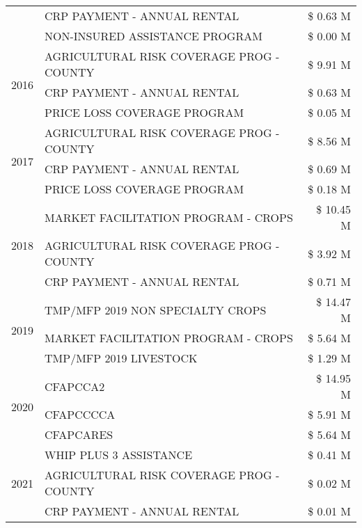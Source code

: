 \begin{tabular}{llr}
 & CRP PAYMENT - ANNUAL RENTAL & \$ 0.63 M \\
 & NON-INSURED ASSISTANCE PROGRAM & \$ 0.00 M \\
\cline{1-3}
\multirow[t]{3}{*}{2016} & AGRICULTURAL RISK COVERAGE PROG - COUNTY & \$ 9.91 M \\
 & CRP PAYMENT - ANNUAL RENTAL & \$ 0.63 M \\
 & PRICE LOSS COVERAGE PROGRAM & \$ 0.05 M \\
\cline{1-3}
\multirow[t]{3}{*}{2017} & AGRICULTURAL RISK COVERAGE PROG - COUNTY & \$ 8.56 M \\
 & CRP PAYMENT - ANNUAL RENTAL & \$ 0.69 M \\
 & PRICE LOSS COVERAGE PROGRAM & \$ 0.18 M \\
\cline{1-3}
\multirow[t]{3}{*}{2018} & MARKET FACILITATION PROGRAM - CROPS & \$ 10.45 M \\
 & AGRICULTURAL RISK COVERAGE PROG - COUNTY & \$ 3.92 M \\
 & CRP PAYMENT - ANNUAL RENTAL & \$ 0.71 M \\
\cline{1-3}
\multirow[t]{3}{*}{2019} & TMP/MFP 2019 NON SPECIALTY CROPS & \$ 14.47 M \\
 & MARKET FACILITATION PROGRAM - CROPS & \$ 5.64 M \\
 & TMP/MFP 2019 LIVESTOCK & \$ 1.29 M \\
\cline{1-3}
\multirow[t]{3}{*}{2020} & CFAPCCA2 & \$ 14.95 M \\
 & CFAPCCCCA & \$ 5.91 M \\
 & CFAPCARES & \$ 5.64 M \\
\cline{1-3}
\multirow[t]{3}{*}{2021} & WHIP PLUS 3 ASSISTANCE & \$ 0.41 M \\
 & AGRICULTURAL RISK COVERAGE PROG - COUNTY & \$ 0.02 M \\
 & CRP PAYMENT - ANNUAL RENTAL & \$ 0.01 M \\
\cline{1-3}
\bottomrule
\end{tabular}
